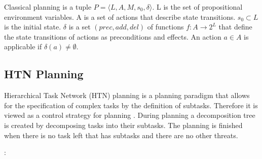 \begin{definition}
  Classical planning is a tuple $P=\langle L,A,M,s_0,\delta \rangle$.
  L is the set of propositional environment variables. 
  A is a set of actions that describe state transitions.
  $s_0 \subset L$ is the initial state.
  $\delta$ is a set $(prec, add , del )$ of functions $f : A \rightarrow 2^L$ that define the state transitions of actions as preconditions and effects.
  An action $a \in A$ is applicable if $\delta(a) \neq \emptyset$.
\end{definition}

\subsection{HTN Planning}\label{sec:htn-planning}

Hierarchical Task Network (HTN) planning is a planning paradigm that allows for the specification of complex tasks by the definition of subtasks.
Therefore it is viewed as a control strategy for planning \citep{ghallabAutomatedPlanningTheory2004}.
During planning a decomposition tree is created by decomposing tasks into their subtasks.
The planning is finished when there is no task left that has subtasks and there are no other threats.


\cite{hollerGuidingSearchHTN2019}:

